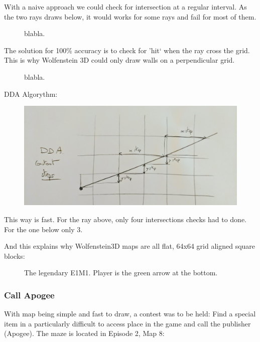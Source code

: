 With a naive approach we could check for intersection at a regular interval. As the two rays draws below, it would works for some rays and fail for most of them.
\begin{figure}[H]
\centering
 
 \caption{blabla.}
\end{figure}

The solution for 100\% accuracy is to check for 'hit` when the ray cross the grid. This is why Wolfenstein 3D could only draw walls on a perpendicular grid.
\begin{figure}[H]
\centering
 
 \caption{blabla.}
\end{figure}
\par
DDA Algorythm:
 \par
\begin{figure}[H]
  \centering
 \includegraphics[width=\textwidth]{imgs/drawings/dda_explainer.png}
\end{figure}
\par

This way is fast. For the ray above, only four intersections checks had to done. For the one below only 3.\\
\par
And this explains why Wolfenstein3D maps are all flat, 64x64 grid aligned square blocks:\\
\par

\begin{figure}[H]
  \centering
 \caption{The legendary E1M1. Player is the green arrow at the bottom.}
\end{figure}




\subsubsection{Call Apogee}
With map being simple and fast to draw, a contest was to be held: Find a special item in a particularly difficult to access place in the game and call the publisher (Apogee). The maze is located in Episode 2, Map 8:\\
\par
\begin{figure}[H]
  \centering
\end{figure}

